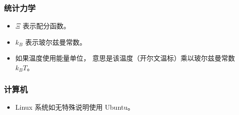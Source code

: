 \subsubsection{统计力学}
\begin{itemize}
\item $\Xi$ 表示配分函数。
\item $k_B$ 表示玻尔兹曼常数。
\item 如果温度使用能量单位， 意思是该温度（开尔文温标）乘以玻尔兹曼常数 $k_B T$。
\end{itemize}

\subsubsection{计算机}
\begin{itemize}
\item Linux 系统如无特殊说明使用 Ubuntu。
\end{itemize}
